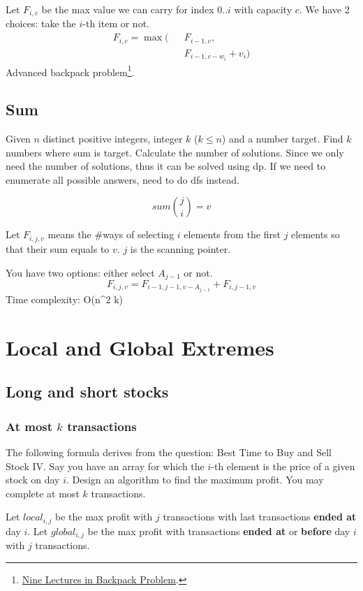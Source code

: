 {Let $F_{i, c}$ be the max value we can carry for index $0..i$ with capacity $c$. We have 2 choices: take the $i$-th item or not.
\begin{eqnarray*}
F_{i, c}= \max\big(&&F_{i-1, c}, \\
&&F_{i-1, c-w_i}+v_i\big)
\end{eqnarray*}
Advanced backpack problem\footnote{\href{http://github.com/tianyicui/pack}{Nine Lectures in Backpack Problem}.}. 

\subsection{Sum}
 Given $n$ distinct positive integers, integer $k$ ($k \leq n$) and a number target. Find $k$ numbers where sum is target. Calculate the number of solutions. Since we only need the number of solutions, thus it can be solved using dp. If we need to enumerate all possible answers, need to do dfs instead. 

$$
sum{j \choose i} = v
$$

Let $F_{i, j, v}$ means the \#ways of selecting $i$ elements from the first $j$ elements so that their sum equals to $v$. $j$ is the scanning pointer.

You have two options: either select $A_{j-1}$ or not.
$$
F_{i, j, v} = F_{i-1, j-1, v-A_{j-1}} + F_{i, j-1, v}
$$
Time complexity: O(n^2 k)
\section{Local and Global Extremes}
\subsection{Long and short stocks}
\subsubsection{At most $k$ transactions}

The following formula derives from the question: Best Time to Buy and Sell Stock IV. Say you have an array for which the $i$-th element is the price of a given stock on day $i$. Design an algorithm to find the maximum profit. You may complete at most $k$ transactions. 

Let $local_{i, j}$ be the max profit with $j$ transactions with last transactions \textbf{ended at} day $i$. Let $global_{i, j}$ be the max profit with transactions \textbf{ended at} or \textbf{before} day $i$ with $j$ transactions. 

}
